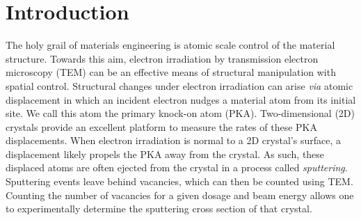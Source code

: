 \documentclass[twoside,twocolumn,9pt]{article}
\begin{document}
\renewcommand*\rmdefault{bch}\normalfont\upshape
\rmfamily
\section*{}
\vspace{-1cm}






\section{Introduction} 
\label{sec:introduction}

The holy grail of materials engineering is atomic scale control of the
material structure.
Towards this aim, electron irradiation by transmission electron microscopy
(TEM) can be an effective means of structural manipulation with spatial
control.\cite{Banhart1999, Egerton2013, Zhao2017, Susi2019}
Structural changes under electron irradiation can arise \textit{via} atomic displacement
in which an incident electron nudges a material atom from its initial site.  We
call this atom the primary knock-on atom (PKA).  Two-dimensional (2D) crystals
provide an excellent platform to measure the rates of these PKA displacements.
When electron irradiation is normal to a 2D crystal's surface, a displacement
likely propels the PKA away from the crystal.
As such, these displaced atoms are often ejected from the crystal in a process
called \textit{sputtering}.  Sputtering events leave behind vacancies, which
can then be counted using TEM.
Counting the number of vacancies for a given dosage and beam energy allows one
to experimentally determine the sputtering cross section of that crystal.
\end{document}
